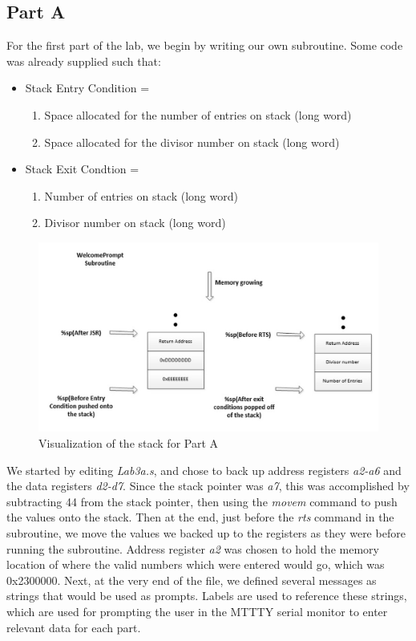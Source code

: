 \documentclass[letterpaper]{article}
\begin{document}
  \subsection{Part A}
    For the first part of the lab, we begin by writing our own subroutine.
    Some code was already supplied such that:
    \begin{itemize}
      \item Stack Entry Condition =
        \begin{enumerate}
          \item Space allocated for the number of entries on stack (long word)
          \item Space allocated for the divisor number on stack (long word)
        \end{enumerate}
      \item Stack Exit Condtion =
        \begin{enumerate}
          \item Number of entries on stack (long word)
          \item Divisor number on stack (long word)
        \end{enumerate}
    \end{itemize}

    \begin{figure}[h!]
      \centering
      \includegraphics[width=.8\textwidth]{designa.jpg}
      \caption{Visualization of the stack for Part A}
    \end{figure}

    We started by editing \textit{Lab3a.s}, and chose to back up
    address registers \textit{a2-a6} and the data registers \textit{d2-d7}. Since the stack pointer
    was \textit{a7}, this was accomplished by subtracting 44 from the stack pointer,
    then using the \textit{movem} command to push the values onto the stack. Then at the end, just before
    the \textit{rts} command in the subroutine, we move the values we backed up to the registers
    as they were before running the subroutine. Address register \textit{a2} was chosen to
    hold the memory location of where the valid numbers which were entered would go, which
    was 0x2300000.
    Next, at the very end of the file, we
    defined several messages as strings that would be used as prompts. Labels are used to reference
    these strings, which are used for prompting the user in the MTTTY serial monitor to enter relevant data for each part.
\end{document}
